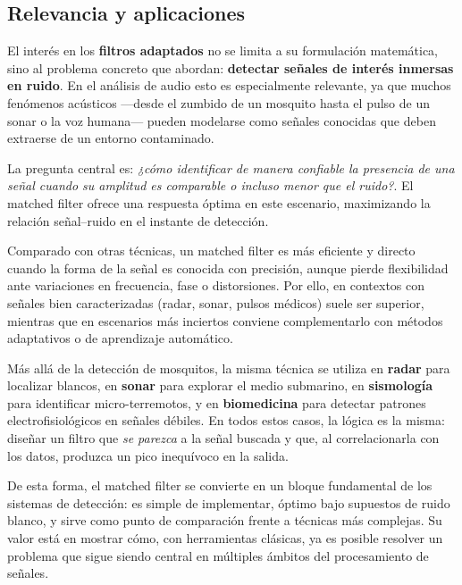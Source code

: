 \subsection{Relevancia y aplicaciones}

El interés en los \textbf{filtros adaptados} no se limita a su formulación matemática, 
sino al problema concreto que abordan: \textbf{detectar señales de interés inmersas en ruido}.  
En el análisis de audio esto es especialmente relevante, ya que muchos fenómenos acústicos 
—desde el zumbido de un mosquito hasta el pulso de un sonar o la voz humana— 
pueden modelarse como señales conocidas que deben extraerse de un entorno contaminado.

La pregunta central es: \textit{¿cómo identificar de manera confiable la presencia de una señal 
	cuando su amplitud es comparable o incluso menor que el ruido?}.  
El matched filter ofrece una respuesta óptima en este escenario, 
maximizando la relación señal--ruido en el instante de detección.  

Comparado con otras técnicas, un matched filter es más eficiente y directo 
cuando la forma de la señal es conocida con precisión, 
aunque pierde flexibilidad ante variaciones en frecuencia, fase o distorsiones.  
Por ello, en contextos con señales bien caracterizadas (radar, sonar, pulsos médicos) 
suele ser superior, mientras que en escenarios más inciertos conviene complementarlo 
con métodos adaptativos o de aprendizaje automático.

Más allá de la detección de mosquitos, la misma técnica se utiliza en \textbf{radar} para localizar blancos, 
en \textbf{sonar} para explorar el medio submarino, en \textbf{sismología} para identificar micro-terremotos, 
y en \textbf{biomedicina} para detectar patrones electrofisiológicos en señales débiles.  
En todos estos casos, la lógica es la misma: diseñar un filtro que \emph{se parezca} a la señal buscada 
y que, al correlacionarla con los datos, produzca un pico inequívoco en la salida.

De esta forma, el matched filter se convierte en un bloque fundamental de los sistemas de detección: 
es simple de implementar, óptimo bajo supuestos de ruido blanco, y sirve como punto de comparación 
frente a técnicas más complejas.  
Su valor está en mostrar cómo, con herramientas clásicas, ya es posible resolver un problema 
que sigue siendo central en múltiples ámbitos del procesamiento de señales.
